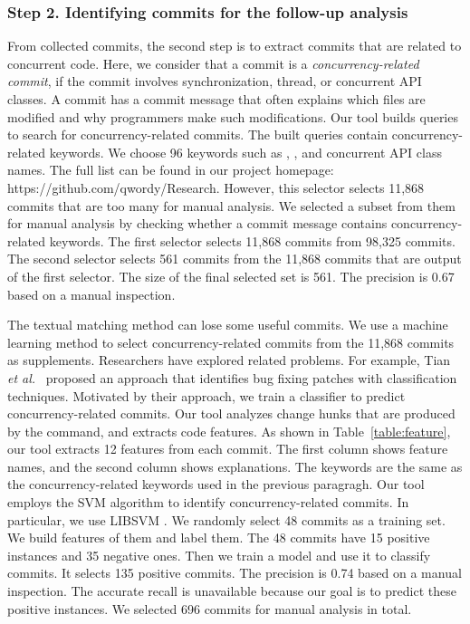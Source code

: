 \subsubsection{Step 2. Identifying commits for the follow-up analysis} From collected commits, the second step is to extract commits that are related to concurrent code. Here, we consider that a commit is a  \emph{concurrency-related commit}, if the commit involves synchronization, thread, or concurrent API classes. A commit has a commit message that often explains which files are modified and why programmers make such modifications. Our tool builds queries to search for concurrency-related commits. The built queries contain concurrency-related keywords. We choose 96 keywords such as , , and concurrent API class names. The full list can be found in our project homepage: https://github.com/qwordy/Research. However, this selector selects 11,868 commits that are too many for manual analysis. We selected a subset from them for manual analysis by checking whether a commit message contains concurrency-related keywords. The first selector selects 11,868 commits from 98,325 commits. The second selector selects 561 commits from the 11,868 commits that are output of the first selector. The size of the final selected set is 561. The precision is 0.67 based on a manual inspection.

The textual matching method can lose some useful commits. We use a machine learning method to select concurrency-related commits from the 11,868 commits as supplements. Researchers have explored related problems. For example, Tian \emph{et al.}~\cite{tian2012identifying} proposed an approach that identifies bug fixing patches with classification techniques. Motivated by their approach, we train a classifier to predict concurrency-related commits. Our tool analyzes change hunks that are produced by the  command, and extracts code features. As shown in Table~\ref{table:feature}, our tool extracts 12 features from each commit. The first column shows feature names, and the second column shows explanations. The keywords are the same as the concurrency-related keywords used in the previous paragragh. Our tool employs the SVM \cite{journals/ml/CortesV95} algorithm to identify concurrency-related commits. In particular, we use LIBSVM \cite{libsvm}. We randomly select 48 commits as a training set. We build features of them and label them. The 48 commits have 15 positive instances and 35 negative ones. Then we train a model and use it to classify commits. It selects 135 positive commits. The precision is 0.74 based on a manual inspection. The accurate recall is unavailable because our goal is to predict these positive instances.
We selected 696 commits for manual analysis in total.



